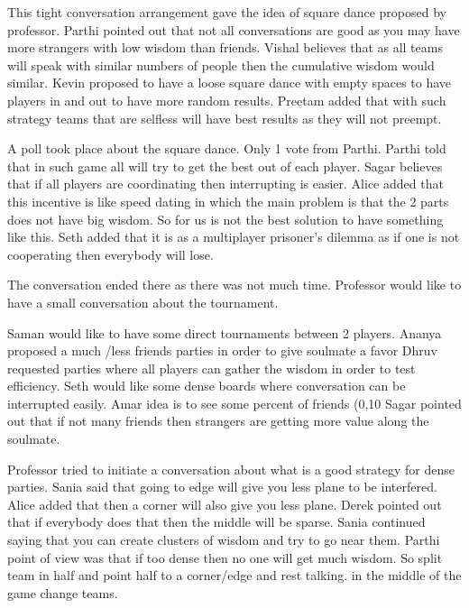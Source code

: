This tight conversation arrangement gave the idea of square dance proposed by professor.
Parthi pointed out that not all conversations are good as you may have more strangers with low wisdom than friends.
Vishal believes that as all teams will speak with similar numbers of people then the cumulative wisdom would similar.
Kevin proposed to have a loose square dance with empty spaces to have players in and out to have more random results.
Preetam added that with such strategy teams that are selfless will have best results as they will not preempt.

A poll took place about the square dance.
Only 1 vote from Parthi.
Parthi told that in such game all will try to get the best out of each player.
Sagar believes that if all players are coordinating then interrupting is easier.
Alice added that this incentive is like speed dating in which the main problem is that the 2 parts does not have big wisdom. So for us is not the best solution to have something like this.
Seth added that it is as a multiplayer prisoner’s dilemma as if one is not cooperating then everybody will lose.

The conversation ended there as there was not much time. Professor would like to have a small conversation about the tournament.

Saman would like to have some direct tournaments between 2 players.
Ananya proposed a much /less friends parties in order to give soulmate a favor
Dhruv requested parties where all players can gather the wisdom in order to test efficiency.
Seth would like some dense boards where conversation can be interrupted easily.
Amar idea is to see some percent of friends (0,10%
Sagar pointed out that if not many friends then strangers are getting more value along the soulmate.

Professor tried to initiate a conversation about what is a good strategy for dense parties.
Sania said that going to edge will give you less plane to be interfered.
Alice added that then a corner will also give you less plane.
Derek pointed out that if everybody does that then the middle will be sparse.
Sania continued saying that you can create clusters of wisdom and try to go near them.
Parthi point of view was that if too dense then no one will get much wisdom. So split team in half and point half to a corner/edge and rest talking. in the middle of the game change teams.
